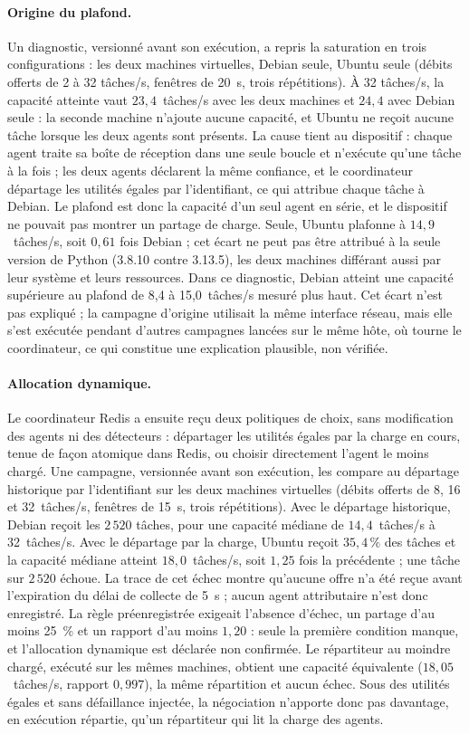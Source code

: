 \paragraph{Origine du plafond.} Un diagnostic, versionné avant son exécution, a repris la saturation en trois configurations : les deux machines virtuelles, Debian seule, Ubuntu seule (débits offerts de 2 à 32 tâches/s, fenêtres de 20~s, trois répétitions). À 32 tâches/s, la capacité atteinte vaut $23{,}4$~tâches/s avec les deux machines et $24{,}4$ avec Debian seule : la seconde machine n'ajoute aucune capacité, et Ubuntu ne reçoit aucune tâche lorsque les deux agents sont présents. La cause tient au dispositif : chaque agent traite sa boîte de réception dans une seule boucle et n'exécute qu'une tâche à la fois ; les deux agents déclarent la même confiance, et le coordinateur départage les utilités égales par l'identifiant, ce qui attribue chaque tâche à Debian. Le plafond est donc la capacité d'un seul agent en série, et le dispositif ne pouvait pas montrer un partage de charge. Seule, Ubuntu plafonne à $14{,}9$~tâches/s, soit $0{,}61$ fois Debian ; cet écart ne peut pas être attribué à la seule version de Python (3.8.10 contre 3.13.5), les deux machines différant aussi par leur système et leurs ressources. Dans ce diagnostic, Debian atteint une capacité supérieure au plafond de 8,4 à 15,0~tâches/s mesuré plus haut. Cet écart n'est pas expliqué ; la campagne d'origine utilisait la même interface réseau, mais elle s'est exécutée pendant d'autres campagnes lancées sur le même hôte, où tourne le coordinateur, ce qui constitue une explication plausible, non vérifiée. \paragraph{Allocation dynamique.} Le coordinateur Redis a ensuite reçu deux politiques de choix, sans modification des agents ni des détecteurs : départager les utilités égales par la charge en cours, tenue de façon atomique dans Redis, ou choisir directement l'agent le moins chargé. Une campagne, versionnée avant son exécution, les compare au départage historique par l'identifiant sur les deux machines virtuelles (débits offerts de 8, 16 et 32~tâches/s, fenêtres de 15~s, trois répétitions). Avec le départage historique, Debian reçoit les $2\,520$ tâches, pour une capacité médiane de $14{,}4$~tâches/s à 32~tâches/s. Avec le départage par la charge, Ubuntu reçoit $35{,}4\,\%$ des tâches et la capacité médiane atteint $18{,}0$~tâches/s, soit $1{,}25$ fois la précédente ; une tâche sur $2\,520$ échoue. La trace de cet échec montre qu'aucune offre n'a été reçue avant l'expiration du délai de collecte de 5~s ; aucun agent attributaire n'est donc enregistré. La règle préenregistrée exigeait l'absence d'échec, un partage d'au moins 25~\% et un rapport d'au moins $1{,}20$ : seule la première condition manque, et l'allocation dynamique est déclarée non confirmée. Le répartiteur au moindre chargé, exécuté sur les mêmes machines, obtient une capacité équivalente ($18{,}05$~tâches/s, rapport $0{,}997$), la même répartition et aucun échec. Sous des utilités égales et sans défaillance injectée, la négociation n'apporte donc pas davantage, en exécution répartie, qu'un répartiteur qui lit la charge des agents.

